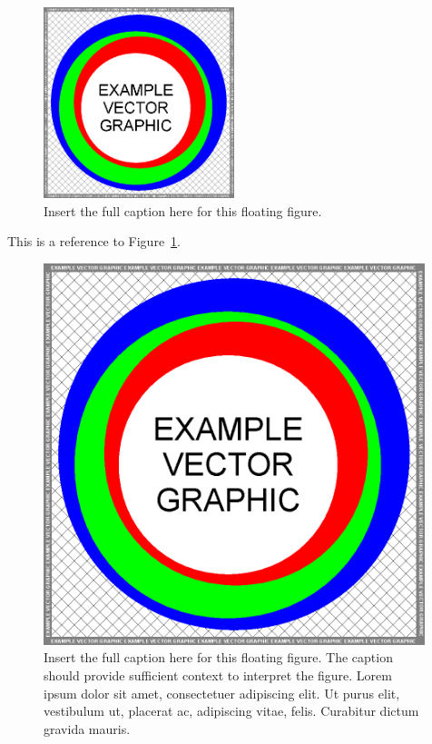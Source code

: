 \begin{figure}
\centering\CaptionFontSize
\includegraphics[height=15em]
{Figure-ChapAbbr-FigureExampleA}
\caption[Insert an abbreviated caption here to show in the List of Figures]
{Insert the full caption here for this floating figure.}
\label{Figure:ChapAbbr:FigureExampleA}
\end{figure}

This is a reference to Figure~\ref{Figure:ChapAbbr:FigureExampleA}.
\lipsum[8]

\begin{figure}
\centering\CaptionFontSize
\includegraphics[height=30em]
{Figure-ChapAbbr-FigureExampleB}
\caption[Insert an abbreviated caption here to show in the List of Figures]
{Insert the full caption here for this floating figure.
The caption should provide sufficient context to interpret the figure.
Lorem ipsum dolor sit amet, consectetuer adipiscing elit.
Ut purus elit, vestibulum ut, placerat ac, adipiscing vitae, felis.
Curabitur dictum gravida mauris.}
\label{Figure:ChapAbbr:FigureExampleB}
\end{figure}

